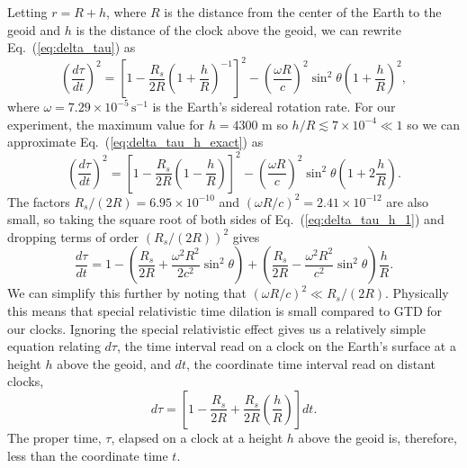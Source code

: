 \documentclass[prb,preprint]{revtex4-1}
\begin{document}
Letting $r = R + h$, where $R$ is the distance from the center of the Earth to the geoid and $h$ is the distance of the clock above the geoid, we can rewrite Eq.~(\ref{eq:delta_tau}) as
\begin{equation}
\label{eq:delta_tau_h_exact}
\left(\frac{d\tau}{dt}\right)^2 = \left[1-\frac{R_s}{2R} \left(1+\frac{h}{R}\right)^{-1}\right]^2 - \left(\frac{\omega R}{c}\right)^2 \sin^2\theta \left(1+\frac{h}{R}\right)^{2},
\end{equation}
where $\omega = 7.29\times10^{-5}\, \mathrm{s}^{-1}$ is the Earth's sidereal rotation rate. For our experiment, the maximum value for $h = 4300$ m so $h/R \lesssim 7\times10^{-4} \ll 1$ so we can approximate Eq.~(\ref{eq:delta_tau_h_exact}) as
\begin{equation}
\label{eq:delta_tau_h_1}
\left(\frac{d\tau}{dt}\right)^2 = \left[1-\frac{R_s}{2R} \left(1-\frac{h}{R}\right)\right]^2 - \left(\frac{\omega R}{c}\right)^2 \sin^2\theta \left(1+2\frac{h}{R}\right).
\end{equation}
The factors $R_s/(2R) = 6.95 \times 10^{-10}$ and $(\omega R/c)^2 = 2.41 \times 10^{-12}$ are also small, so taking the square root of both sides of Eq.~(\ref{eq:delta_tau_h_1}) and dropping terms of order $(R_s/(2R))^2$ gives
\begin{equation}
\label{eq:delta_tau_h}
\frac{d\tau}{dt} =  1-\left(\frac{R_s}{2R}+ \frac{\omega^2 R^2}{2 c^2}\sin^2\theta\right) + \left( \frac{R_s}{2R} - \frac{\omega^2 R^2}{c^2}\sin^2\theta\right) \frac{h}{R}.
\end{equation}
We can simplify this further by noting that $(\omega R/c)^2 \ll R_s/(2R)$. Physically this means that  special relativistic time dilation is small compared to GTD for our clocks. Ignoring the special relativistic effect gives us a relatively simple equation relating $d\tau$, the time interval read on a clock on the Earth's surface at a height $h$ above the geoid, and $dt$, the coordinate time interval read on distant clocks,
\begin{equation}
\label{eq:dtau_GTD}
d\tau = \left[ 1-\frac{R_s}{2R} +  \frac{R_s}{2R}  \left(\frac{h}{R}\right) \right]dt.
\end{equation}
The proper time, $\tau$, elapsed on a clock at a height $h$ above the geoid is, therefore, less than the coordinate time $t$. 
\end{document}
